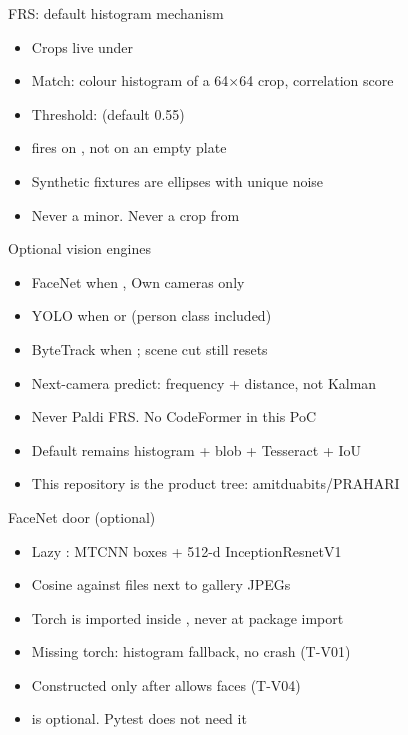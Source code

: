 \documentclass[aspectratio=169,11pt]{beamer}
\begin{document}
\begin{frame}{FRS: default histogram mechanism}
\begin{itemize}\itemsep0.55em
\item Crops live under 
\item Match: colour histogram of a 64$\times$64 crop, correlation score
\item Threshold:  (default 0.55)
\item {} fires on , not on an empty plate
\item Synthetic fixtures are ellipses with unique noise
\item Never a minor. Never a crop from 
\end{itemize}
\end{frame}

\begin{frame}{Optional vision engines}
\begin{itemize}\itemsep0.5em
\item FaceNet when , Own cameras only
\item YOLO when  or  (person class included)
\item ByteTrack when ; scene cut still resets
\item Next-camera predict: frequency + distance, not Kalman
\item Never Paldi FRS. No CodeFormer in this PoC
\item Default remains histogram + blob + Tesseract + IoU
\item This repository is the product tree: amitduabits/PRAHARI
\end{itemize}
\end{frame}

\begin{frame}{FaceNet door (optional)}
\begin{itemize}\itemsep0.55em
\item Lazy : MTCNN boxes + 512-d InceptionResnetV1
\item Cosine against  files next to gallery JPEGs
\item Torch is imported inside , never at package import
\item Missing torch: histogram fallback, no crash (T-V01)
\item Constructed only after  allows faces (T-V04)
\item {} is optional. Pytest does not need it
\end{itemize}
\end{frame}
\end{document}
